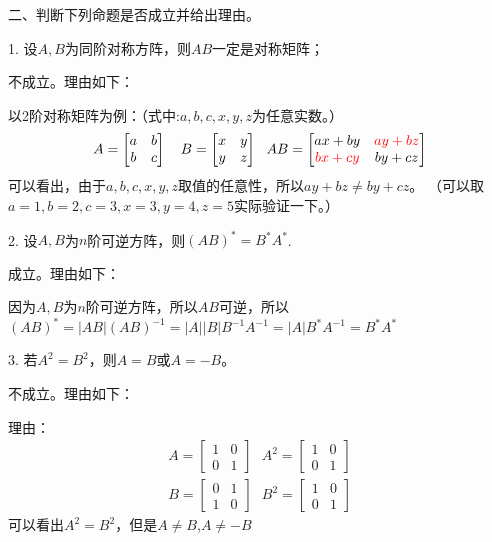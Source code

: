 \documentclass{article}
\begin{document}
二、判断下列命题是否成立并给出理由。

1. 设$A,B$为同阶对称方阵，则$AB$一定是对称矩阵；

\begin{jie}
不成立。理由如下：

以2阶对称矩阵为例：（式中:$a,b,c,x,y,z$为任意实数。）
\begin{equation*}
A=\begin{bmatrix}
  a & b \\
  b & c
\end{bmatrix}~~~B=
\begin{bmatrix}
  x & y \\
  y & z
\end{bmatrix}~~AB=
\begin{bmatrix}
  ax+by & \textcolor[rgb]{1.00,0.00,0.00}{ay+bz}\\
  \textcolor[rgb]{1.00,0.00,0.00}{bx+cy} & by+cz
\end{bmatrix}
\end{equation*}
可以看出，由于$a,b,c,x,y,z$取值的任意性，所以$ay+bz\neq by+cz$。 （可以取$a=1,b=2,c=3,x=3,y=4,z=5$实际验证一下。）
\end{jie}

2. 设$A,B$为$n$阶可逆方阵，则$(AB)^{*}=B^{*}A^{*}$.

\begin{jie}
成立。理由如下：

因为$A,B$为$n$阶可逆方阵，所以$AB$可逆，所以$(AB)^{*}=|AB|(AB)^{-1}=|A||B|B^{-1}A^{-1}=|A|B^{*}A^{-1}=B^{*}A^{*}$
\end{jie}

3. 若$A^{2}=B^{2}$，则$A=B$或$A=-B$。

\begin{jie}
不成立。理由如下：

理由：
\begin{align*}
 A=\begin{bmatrix}
  1 & 0\\
  0 & 1
   \end{bmatrix}~~~
 A^{2}=\begin{bmatrix}
         1 & 0\\
         0 & 1
       \end{bmatrix}\\
 B=\begin{bmatrix}
  0 & 1\\
  1 & 0
   \end{bmatrix}~~~
 B^{2}=\begin{bmatrix}
         1 & 0\\
         0 & 1
       \end{bmatrix}
\end{align*}
可以看出$A^{2}=B^{2}$，但是$A\neq B$,$A\neq -B$
\end{jie}
\end{document}
